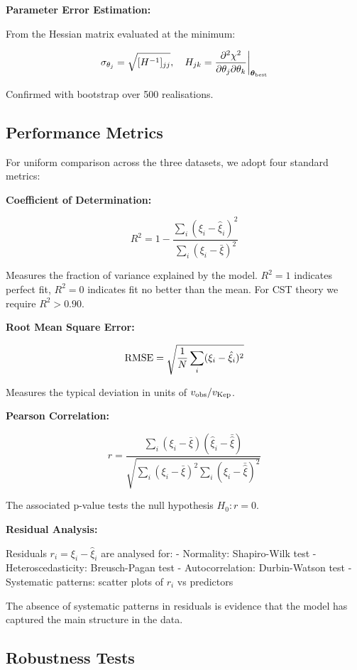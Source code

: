 \documentclass[11pt,a4paper]{article}
\begin{document}
\textbf{Parameter Error Estimation:}

From the Hessian matrix evaluated at the minimum:

\[\sigma_{\theta_j} = \sqrt{[H^{-1}]_{jj}}, \quad H_{jk} = \frac{\partial^2 \chi^2}{\partial\theta_j \partial\theta_k}\bigg|_{\boldsymbol\theta_{\rm best}}\]

Confirmed with bootstrap over 500 realisations.

\hypertarget{performance-metrics}{%
\subsection{Performance Metrics}\label{performance-metrics}}

For uniform comparison across the three datasets, we adopt four standard
metrics:

\textbf{Coefficient of Determination:}

\[R^2 = 1 - \frac{\sum_i (\xi_i - \hat\xi_i)^2}{\sum_i (\xi_i - \bar\xi)^2}\]

Measures the fraction of variance explained by the model. \(R^2 = 1\)
indicates perfect fit, \(R^2 = 0\) indicates fit no better than the
mean. For CST theory we require \(R^2 > 0.90\).

\textbf{Root Mean Square Error:}

\[{\rm RMSE} = \sqrt{\frac{1}{N}\sum_i (\xi_i - \hat\xi_i)^2}\]

Measures the typical deviation in units of \(v_{\rm obs}/v_{\rm Kep}\).

\textbf{Pearson Correlation:}

\[r = \frac{\sum_i (\xi_i - \bar\xi)(\hat\xi_i - \bar{\hat\xi})}{\sqrt{\sum_i (\xi_i-\bar\xi)^2 \sum_i (\hat\xi_i - \bar{\hat\xi})^2}}\]

The associated p-value tests the null hypothesis \(H_0: r = 0\).

\textbf{Residual Analysis:}

Residuals \(r_i = \xi_i - \hat\xi_i\) are analysed for: - Normality:
Shapiro-Wilk test - Heteroscedasticity: Breusch-Pagan test -
Autocorrelation: Durbin-Watson test - Systematic patterns: scatter plots
of \(r_i\) vs predictors

The absence of systematic patterns in residuals is evidence that the
model has captured the main structure in the data.

\hypertarget{robustness-tests}{%
\subsection{Robustness Tests}\label{robustness-tests}}
\end{document}

